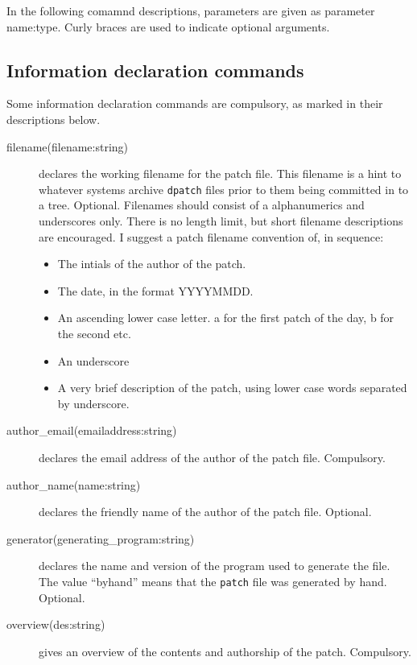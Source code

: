 \documentclass{article}
\begin{document}
In the following comamnd descriptions, parameters are given as parameter
name:type. Curly braces are used to indicate optional arguments. 



\subsection{Information declaration commands}

Some information declaration commands are compulsory, as marked in
their descriptions below. 

\begin{description}

\item[filename(filename:string)] declares the working filename for the
patch file. This filename is a hint to whatever systems archive
\texttt{dpatch} files prior to them being committed in to a
tree. Optional. Filenames should consist of a alphanumerics and
underscores only. There is no length limit, but short filename
descriptions are encouraged. I suggest a patch filename convention of,
in sequence:

\begin{itemize}
\item The intials of the author of the patch.
\item The date, in the format YYYYMMDD.
\item An ascending lower case letter. a for the first patch of the
 day, b for the second etc.
\item An underscore
\item A very brief description of the patch, using lower case words
 separated by underscore.
\end{itemize}

\item[author\_email(emailaddress:string)] declares the email address of the author
of the patch file. Compulsory.

\item[author\_name(name:string)] declares the friendly name of the author of
the patch file. Optional.

\item[generator(generating\_program:string)] declares the name and version of the program
used to generate the file. The value ``byhand'' means that
the \texttt{patch} file was generated by hand. Optional.

\item[overview(des:string)] gives an overview of the contents and
authorship of the patch. Compulsory.


\end{description}
\end{document}
